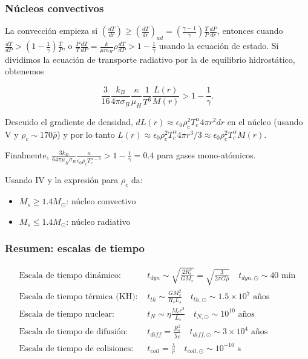 \documentclass[11pt,letterpaper]{article}
\begin{document}
\subsubsection{Núcleos convectivos}

La convección empieza si \(\left( \frac{dT}{dr} \right) \ge \left( \frac{dT}{dr} \right)_{ad} = \left( \frac{\gamma - 1}{\gamma} \right) \frac{T}{P} \frac{dP}{dr}\), entonces cuando \(\frac{dT}{dP} > \left( 1 - \frac{1}{\gamma} \right) \frac{T}{P}\), o \(\frac{P}{T} \frac{dT}{dP} = \frac{k}{\mu m_H} \rho \frac{dT}{dP} > 1 - \frac{1}{\gamma}\) usando la ecuación de estado. Si dividimos la ecuación de transporte radiativo por la de equilibrio hidrostático, obtenemos 

\begin{equation}
    \frac{3}{16} \frac{k_B}{4\pi \sigma_B} \frac{\kappa}{\mu_H} \frac{1}{T^3} \frac{L(r)}{M(r)} > 1 - \frac{1}{\gamma}.
\end{equation}

Descuido el gradiente de densidad, \(dL(r) \approx \epsilon_0 \rho_c^2 T_c^\alpha 4\pi r^2 dr\) en el núcleo (usando V y \(\rho_c \sim 170\bar{\rho}\)) y por lo tanto \(L(r) \approx \epsilon_0 \rho_c^2 T_c^\alpha 4\pi r^3/3 \approx \epsilon_0 \rho_c^2 T_c^\alpha M(r)\).

Finalmente, \(\frac{3 k_B}{64 \pi \mu_H \sigma_B} \frac{\kappa}{\epsilon_0 \rho_c T_c^{\alpha-3}} > 1 - \frac{1}{\gamma} = 0.4\) para gases mono-atómicos.

Usando IV y la expresión para \(\rho_c\) da:
\begin{itemize}
    \item \(M_s \ge 1.4 M_\odot\): núcleo convectivo
    \item \(M_s \le 1.4 M_\odot\): núcleo radiativo
\end{itemize}

\subsubsection*{Resumen: escalas de tiempo}

\begin{align*}
    \text{Escala de tiempo dinámico: } & t_{dyn} \sim \sqrt{\frac{2 R_s^3}{GM_s}} = \sqrt{\frac{3}{2\pi G \bar{\rho}}} \quad t_{dyn, \odot} \sim 40 \text{ min} \\
    \text{Escala de tiempo térmica (KH): } & t_{th} \sim \frac{GM_s^2}{R_s L_s} \quad t_{th, \odot} \sim 1.5 \times 10^7 \text{ años} \\
    \text{Escala de tiempo nuclear: } & t_N \sim \eta \frac{M_c c^2}{L_s} \quad t_{N, \odot} \sim 10^{10} \text{ años} \\
    \text{Escala de tiempo de difusión: } & t_{diff} = \frac{R_s^2}{\bar{\lambda} c} \quad t_{diff, \odot} \sim 3 \times 10^4 \text{ años} \\
    \text{Escala de tiempo de colisiones: } & t_{coll} = \frac{\lambda}{c} \quad t_{coll, \odot} \sim 10^{-10} \text{ s}
\end{align*}
\end{document}
